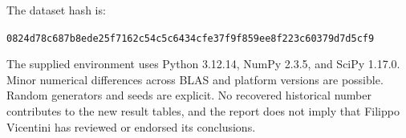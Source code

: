 \documentclass[
  11pt,
  a4paper,
]{article}
\begin{document}
The dataset hash is:

\texttt{0824d78c687b8ede25f7162c54c5c6434cfe37f9f859ee8f223c60379d7d5cf9}

The supplied environment uses Python 3.12.14, NumPy 2.3.5, and SciPy
1.17.0. Minor numerical differences across BLAS and platform versions
are possible. Random generators and seeds are explicit. No recovered
historical number contributes to the new result tables, and the report
does not imply that Filippo Vicentini has reviewed or endorsed its
conclusions.
\end{document}

